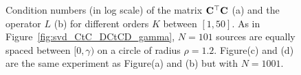 \begin{figure}[htp]
  \centering
  \caption{Condition numbers (in log scale) of the matrix $\mathbf{C}^\top\mathbf{C}$ (a) and the operator $L$ (b)
  for
    different orders $K$ between $[1,50]$. As in Figure~\ref{fig:svd_CtC_DCtCD_gamma}, $N=101$ sources
    are equally spaced between $[0,\gamma)$ on a circle of radius $\rho=1.2$. Figure(c) and (d) are
    the same experiment as Figure(a) and (b) but with $N=1001$.}
  \label{fig:svd_CtC_DCtCD_cond}
\end{figure}

